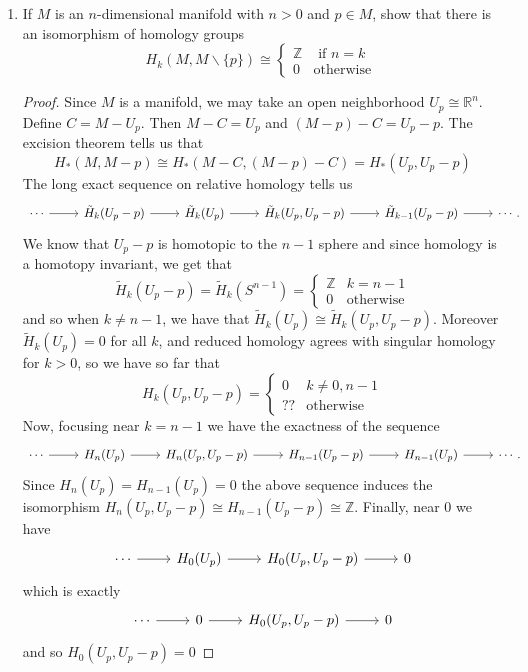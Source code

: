 \documentclass{article}
\begin{document}
\begin{enumerate}
\begin{enumerate}
		\item If $M$ is an $n$-dimensional manifold with $n > 0$ and $p \in M$, show that
		there is an isomorphism of homology groups
		\[ H_k(M, M\backslash \{ p\}) \cong \begin{cases} \mathbb{Z} & \text{ if $n = k$ }\\ 0 & \text{otherwise} \end{cases} \]
		
		\begin{proof}
		
		Since $M$ is a manifold, we may take an open neighborhood $U_p \cong \mathbb{R}^n$.
		Define $C = M- U_p$. Then $M-C = U_p$ and $(M-p) - C = U_p - p$.
		 The excision theorem tells us that
		\[H_*( M, M - p ) \cong H_*(M - C, (M-p)- C) = H_*(U_p, U_p-p)\]
		The long exact sequence on relative homology tells us
		\[\begin{tikzcd}
		\cdots \arrow[r] & \tilde{H}_k(U_p - p) \arrow[r] & \tilde{H}_k(U_p) \arrow[r] & \tilde{H}_k(U_p, U_p-p) \arrow[r] & \tilde{H}_{k-1}(U_p-p) \arrow[r] & \cdots.
		\end{tikzcd}\]
		We know that $U_p - p$ is homotopic to the $n-1$ sphere and since homology is a homotopy invariant, we get that
		\[\tilde{H}_k(U_p - p ) = \tilde{H}_k(S^{n-1}) = \begin{cases} \mathbb{Z} & {k=n-1} \\ 0 & \text{otherwise} \end{cases} \]
		and so when $k \neq n-1$, we have that 
		$\tilde{H}_k(U_p) \cong \tilde{H}_k(U_p, U_p-p) $. Moreover $\tilde{H}_k(U_p) = 0$ for all $k$, and reduced homology agrees with
		singular homology for $k>0$, so we have so far that
		\[H_k(U_p, U_p-p) = \begin{cases} 0 & k \neq 0, n-1 \\ ?? & \text{otherwise} \end{cases}\]
		Now, focusing near $k=n-1$ we have the exactness of the sequence
		\[\begin{tikzcd}
		\cdots \arrow[r] & H_n(U_p) \arrow[r] & H_n(U_p, U_p-p) \arrow[r]  & H_{n-1}(U_p - p) \arrow[r] & H_{n-1}(U_p) \arrow[r] & \cdots.
		\end{tikzcd}\]
		Since $H_n (U_p) = H_{n-1}(U_p) = 0$ the above sequence induces the isomorphism
		$H_n(U_p, U_p-p) \cong H_{n-1}(U_p - p) \cong \mathbb{Z}$.
		Finally, near $0$ we have
		\[ \begin{tikzcd}
		\cdots \arrow[r] & H_0 (U_p) \arrow[r] & H_0 (U_p, U_p-p) \arrow[r] & 0
		\end{tikzcd} \]
		which is exactly
		\[ \begin{tikzcd}
		\cdots \arrow[r] & 0 \arrow[r] & H_0 (U_p, U_p-p) \arrow[r] & 0
		\end{tikzcd} \]
		and so $H_0 (U_p, U_p-p) = 0$
		\end{proof}


\end{enumerate}
\end{enumerate}
\end{document}
